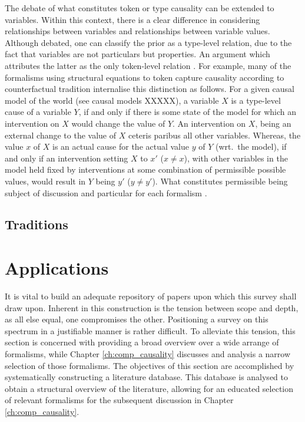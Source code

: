 \documentclass[11pt,a4paper]{book}
\theoremstyle{definition}
\theoremstyle{definition}
\theoremstyle{definition}
\theoremstyle{remark}
\begin{document}
The debate of what constitutes token or type causality can be extended to variables. Within this context, there is a clear difference in considering relationships between variables and relationships between variable values.
Although debated, one can classify the prior as a type-level relation, due to the fact that variables are not particulars but properties. An argument which attributes the latter as the only token-level relation \cite{hausman2005causal}.
For example, many of the formalisms using structural equations to token capture causality according to counterfactual tradition internalise this distinction as follows.
For a given causal model of the world (see causal models XXXXX), a variable $X$ is a type-level cause of a variable $Y$, if and only if there is some state of the model for which an intervention on $X$ would change the value of $Y$. An intervention on $X$, being an external change to the value of $X$ ceteris paribus all other variables. 
Whereas, the value $x$ of $X$ is an actual cause for the actual value $y$ of $Y$ (wrt.\ the model), if and only if an intervention setting $X$ to $x'$ ($x \neq x$), with other variables in the model held fixed by interventions at some combination of permissible possible values, would result in $Y$ being $y'$ ($y\neq y'$). What constitutes permissible being subject of discussion and particular for each formalism \cite{Weslake2015partialtheory}.



\subsection{Traditions}




\section{Applications}







It is vital to build an adequate repository of papers upon which this survey shall draw upon. Inherent in this construction is the tension between scope and depth, as all else equal, one compromises the other. Positioning a survey on this spectrum in a justifiable manner is rather difficult. To alleviate this tension, this section is concerned with providing a broad overview over a wide arrange of formalisms, while Chapter \ref{ch:comp_causality} discusses and analysis a narrow selection of those formalisms. The objectives of this section are accomplished by systematically constructing a literature database.
This database is analysed to obtain a structural overview of the literature, allowing for an educated selection of relevant formalisms for the subsequent discussion in Chapter \ref{ch:comp_causality}.
\end{document}

